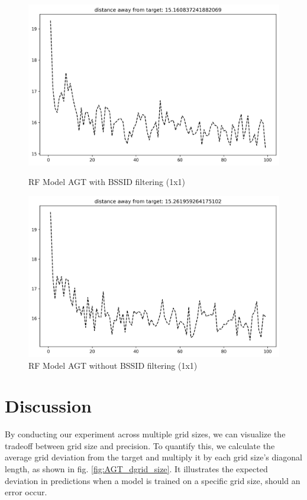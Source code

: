 \documentclass[runningheads]{llncs}
\begin{document}
\begin{figure}[hbt!]
	\begin{minipage}{0.45\textwidth}
		\centering
		\includegraphics[width=\linewidth]{image4.png}
		\caption{RF Model AGT with BSSID filtering (1x1)}
		\label{fig:rf_agt_filter}
	\end{minipage}
	\hfill
	\begin{minipage}{0.45\textwidth}
		\centering
		\includegraphics[width=\linewidth]{image7.png}
		\caption{RF Model AGT without BSSID filtering (1x1)}
		\label{fig:rf_agt_nofilter}
	\end{minipage}
\end{figure}

\section{Discussion}
\vspace{-10pt}
By conducting our experiment across multiple grid sizes, we can visualize the tradeoff between grid size and precision. To quantify this, we calculate the average grid deviation from the target and multiply it by each grid size’s diagonal length, as shown in fig. \ref{fig:AGT_dgrid_size}. It illustrates the expected deviation in predictions when a model is trained on a specific grid size, should an error occur.
\end{document}

